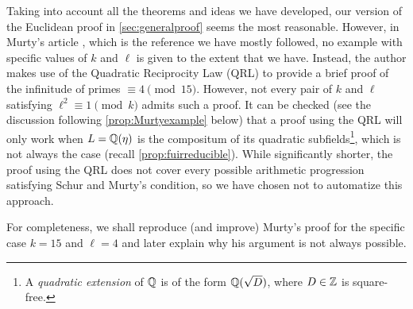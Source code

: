 \documentclass[../main.tex]{subfiles}
\begin{document}
Taking into account all the theorems and ideas we have developed, our version of the Euclidean proof in \cref{sec:generalproof} seems the most reasonable. However, in Murty's article \cite{Murty}, which is the reference we have mostly followed, no example with specific values of $k$ and $\ell$ is given to the extent that we have. Instead, the author makes use of the Quadratic Reciprocity Law (QRL) to provide a brief proof of the infinitude of primes $\equiv 4\pmod{15}$. However, not every pair of $k$ and $\ell$ satisfying $\ell^2\equiv 1 \pmod{k}$ admits such a proof. It can be checked (see the discussion following \cref{prop:Murtyexample} below) that a proof using the QRL will only work when $L=\mathbb{Q}(\eta)$ is the compositum of its quadratic subfields\footnote{A \emph{quadratic extension} of $\mathbb{Q}$ is of the form $\mathbb{Q}(\sqrt{D})$, where $D\in\mathbb{Z}$ is square-free.}, which is not always the case (recall \cref{prop:fuirreducible}). While significantly shorter, the proof using the QRL does not cover every possible arithmetic progression satisfying Schur and Murty's condition, so we have chosen not to automatize this approach.

For completeness, we shall reproduce (and improve) Murty's proof for the specific case $k=15$ and $\ell=4$ and later explain why his argument is not always possible.
\end{document}
